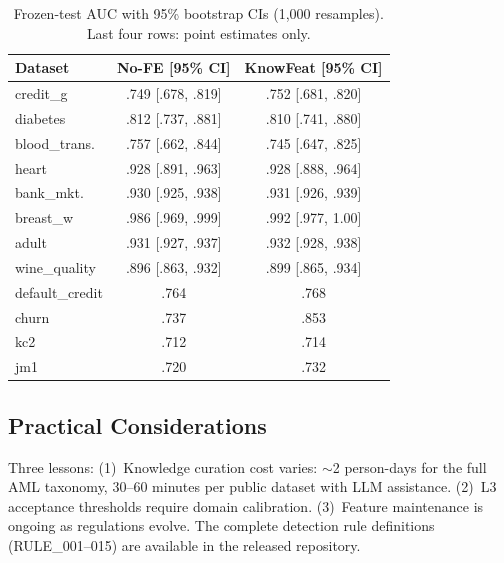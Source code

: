 \begin{table}[H]
\centering
\caption{Frozen-test AUC with 95\% bootstrap CIs (1{,}000 resamples). Last four rows: point estimates only.}
\label{tab:auc_ci}
\small
\setlength{\tabcolsep}{3pt}
\begin{tabular}{l c c}
\hline
\textbf{Dataset} & \textbf{No-FE [95\% CI]} & \textbf{KnowFeat [95\% CI]} \\
\hline
credit\_g          & .749 [.678, .819] & .752 [.681, .820] \\
diabetes           & .812 [.737, .881] & .810 [.741, .880] \\
blood\_trans.      & .757 [.662, .844] & .745 [.647, .825] \\
heart              & .928 [.891, .963] & .928 [.888, .964] \\
bank\_mkt.         & .930 [.925, .938] & .931 [.926, .939] \\
breast\_w          & .986 [.969, .999] & .992 [.977, 1.00] \\
adult              & .931 [.927, .937] & .932 [.928, .938] \\
wine\_quality      & .896 [.863, .932] & .899 [.865, .934] \\
default\_credit    & .764 & .768 \\
churn              & .737 & .853 \\
kc2                & .712 & .714 \\
jm1                & .720 & .732 \\
\hline
\end{tabular}
\end{table}

\subsection{Practical Considerations}
Three lessons: (1)~Knowledge curation cost varies: $\sim$2 person-days for the full AML taxonomy, 30--60 minutes per public dataset with LLM assistance. (2)~L3 acceptance thresholds require domain calibration. (3)~Feature maintenance is ongoing as regulations evolve. The complete detection rule definitions (RULE\_001--015) are available in the released repository.
